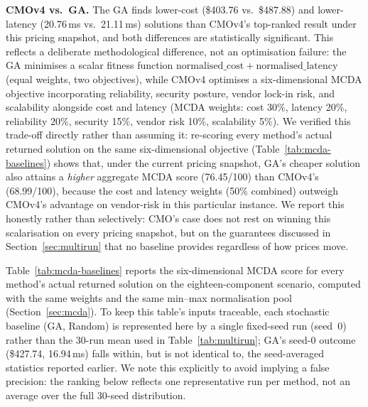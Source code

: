 \documentclass[journal]{IEEEtran}
\newcommand{\cmo}{CMO\xspace}
\newcommand{\cmofour}{CMOv4\xspace}
\begin{document}
\textbf{CMOv4 vs.\ GA.}
The GA finds lower-cost (\$403.76 vs.\ \$487.88) and lower-latency
(20.76\,ms vs.\ 21.11\,ms) solutions than \cmofour's top-ranked result under
this pricing snapshot, and both differences are statistically significant.
This reflects a deliberate methodological difference, not an optimisation
failure: the GA minimises a scalar fitness function
$\mathrm{normalised\_cost} + \mathrm{normalised\_latency}$ (equal weights, two
objectives), while \cmofour optimises a six-dimensional MCDA objective
incorporating reliability, security posture, vendor lock-in risk, and
scalability alongside cost and latency (MCDA weights: cost 30\%, latency
20\%, reliability 20\%, security 15\%, vendor risk 10\%, scalability 5\%). We
verified this trade-off directly rather than assuming it: re-scoring every
method's actual returned solution on the same six-dimensional objective
(Table~\ref{tab:mcda-baselines}) shows that, under the current pricing
snapshot, GA's cheaper solution also attains a \emph{higher} aggregate MCDA
score (76.45/100) than \cmofour's (68.99/100), because the cost and latency
weights (50\% combined) outweigh \cmofour's advantage on vendor-risk in this
particular instance. We report this honestly rather than selectively: \cmo's
case does not rest on winning this scalarisation on every pricing snapshot,
but on the guarantees discussed in Section~\ref{sec:multirun} that no
baseline provides regardless of how prices move.

Table~\ref{tab:mcda-baselines} reports the six-dimensional MCDA score for
every method's actual returned solution on the eighteen-component scenario,
computed with the same weights and the same min--max normalisation pool
(Section~\ref{sec:mcda}). To keep this table's inputs traceable, each
stochastic baseline (GA, Random) is represented here by a single fixed-seed
run (seed~0) rather than the 30-run mean used in Table~\ref{tab:multirun}; GA's
seed-0 outcome (\$427.74, 16.94\,ms) falls within, but is not identical to,
the seed-averaged statistics reported earlier. We note this explicitly to
avoid implying a false precision: the ranking below reflects one representative
run per method, not an average over the full 30-seed distribution.
\end{document}
